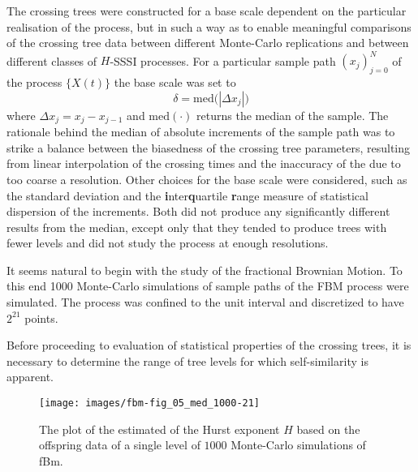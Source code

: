 The crossing trees were constructed for a base scale dependent on the particular
realisation of the process, but in such a way as to enable meaningful comparisons
of the crossing tree data between different Monte-Carlo replications and between
different classes of $H$-SSSI processes. For a particular sample path $(x_j)_{j=0}^N$
of the process $\{X(t)\}$ the base scale was set to \[
\delta = \text{med}\bigl( |\Delta x_j| \bigr)
\]
where $\Delta x_j = x_j-x_{j-1}$ and $\text{med}(\cdot)$ returns the median of
the sample. The rationale behind the median of absolute increments of the sample
path was to strike a balance between the biasedness of the crossing tree parameters,
resulting from linear interpolation of the crossing times and the inaccuracy of
the due to too coarse a resolution. Other choices for the base scale were considered,
such as the standard deviation and the \textbf{i}nter\textbf{q}uartile \textbf{r}ange
measure of statistical dispersion of the increments. Both did not produce any significantly
different results from the median, except only that they tended to produce trees with
fewer levels and did not study the process at enough resolutions.

It seems natural to begin with the study of the fractional Brownian Motion. To this
end 1000 Monte-Carlo simulations of sample paths of the FBM process were simulated.
The process was confined to the unit interval and discretized to have $2^{21}$ points.

Before proceeding to evaluation of statistical properties of the crossing trees,
it is necessary to determine the range of tree levels for which self-similarity
is apparent. 
\begin{figure}[htb]\begin{center}
    \texttt{[image: images/fbm-fig\_05\_med\_1000-21]}
    \caption{The plot of the estimated of the Hurst exponent $H$ based on the offspring
    data of a single level of $1000$ Monte-Carlo simulations of fBm.}
\label{fig:fbm_hurst_crossing_tree}
\end{center}\end{figure}

